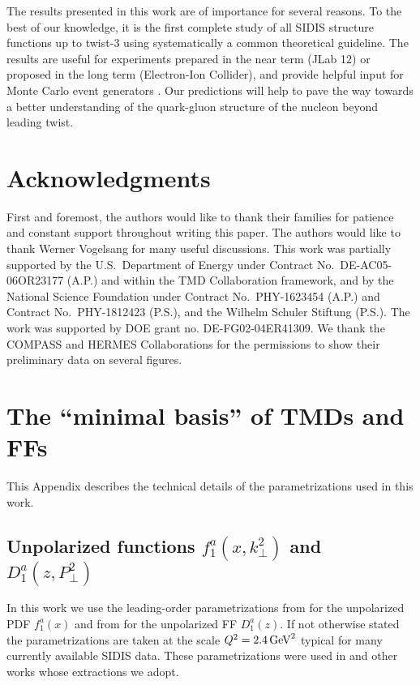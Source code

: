\documentclass[a4paper,11pt]{article}
\begin{document}
The results presented in this work are of importance for several reasons.
To the best of our knowledge, it is the first complete study of all SIDIS
structure functions up to twist-3 
using systematically a common theoretical guideline.
The results are
useful for experiments prepared in the near term (JLab 12) or proposed
in the long term (Electron-Ion Collider), and provide helpful input for
Monte Carlo event generators \cite{Avakian:2015vha}.
Our predictions will help to pave the way
towards a better understanding of the quark-gluon structure
of the nucleon beyond leading twist.



\section{Acknowledgments}
First and foremost, the authors would like to thank their families
for patience and constant support throughout writing this paper.
The authors would like to thank Werner Vogelsang for many useful
discussions. This work was partially supported by the U.S.\
Department of Energy under Contract No.~DE-AC05-06OR23177 (A.P.)
and within the TMD Collaboration framework, and by the National
Science Foundation under Contract No.\ PHY-1623454 (A.P.) and
Contract No.\ PHY-1812423 (P.S.), and the Wilhelm Schuler Stiftung (P.S.). The work was supported by DOE grant no. DE-FG02-04ER41309.
We thank the COMPASS and HERMES Collaborations for the 
permissions to show their preliminary data on several figures.



\appendix

\section{\boldmath The ``minimal basis'' of TMDs and FFs}
\label{App:basis}

This Appendix describes the technical details of the parametrizations
used in this work.

\subsection{\boldmath Unpolarized functions $f_1^a(x,k_\perp^2)$
			and $D_1^a(z,P_\perp^2)$}
\label{App:basis-f1-D1}

In this work we use the leading-order parametrizations
from \cite{Martin:2009iq} for the unpolarized PDF $f_1^a(x)$ and
from \cite{deFlorian:2007aj} for the unpolarized FF $D_1^a(z)$.
If not otherwise stated the parametrizations are taken at the scale
$Q^2=2.4\,{\rm GeV}^2$ typical for many currently available SIDIS data.
These parametrizations were used in \cite{Anselmino:2005nn} and other
works whose extractions we adopt.
\end{document}
